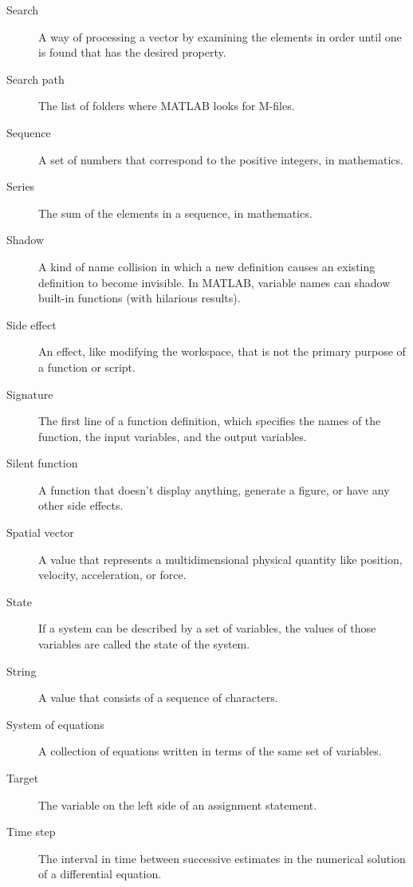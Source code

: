 \begin{description}
\item[Search] A way of processing a vector by examining the
elements in order until one is found that has the desired property.

\item[Search path] The list of folders where MATLAB looks for
M-files.

\item[Sequence] A set of numbers that correspond
to the positive integers, in mathematics.

\item[Series] The sum of the elements in a sequence, in mathematics.

\item[Shadow] A kind of name collision in which a new definition
causes an existing definition to become invisible.  In MATLAB,
variable names can shadow built-in functions (with hilarious results).

\item[Side effect] An effect, like modifying the workspace, that
is not the primary purpose of a function or script.

\item[Signature] The first line of a function definition, which
specifies the names of the function, the input variables, and the
output variables.

\item[Silent function] A function that doesn't display anything,
generate a figure, or have any other side effects.

\item[Spatial vector] A value that represents a
multidimensional physical quantity like position, velocity,
acceleration, or force.

\item[State] If a system can be described by a set of variables,
the values of those variables are called the state of the system.

\item[String] A value that consists of a sequence of characters.

\item[System of equations] A collection of equations written in terms of
the same set of variables.

\item[Target] The variable on the left side of an assignment statement.

\item[Time step] The interval in time between successive estimates
in the numerical solution of a differential equation.


\end{description}
